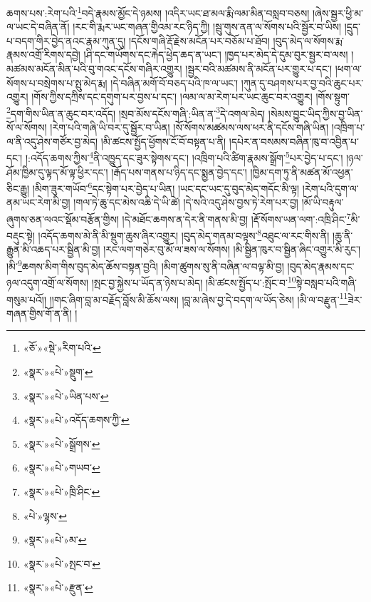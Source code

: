 ཆགས་པས་:རེག་པའི་\footnote{«ཅོ་»«སྡེ་»རིག་པའི་}བདེ་རྣམས་མྱོང་དེ་ཉམས། །འདིར་ཡང་ཐ་མལ་རྨི་ལམ་མིན་བསླབ་བཅས། །ཞེས་སྦྱར་ཕྱི་མ་ལ་ཡང་དེ་བཞིན་ནོ། །རང་གི་རྨར་ཡང་གཞན་གྱིའམ་རང་ཉིད་ཀྱི། །སྦུ་གུས་ནན་ལ་སོགས་པའི་སྦྱོར་བ་ཡིས། །དྲུད་པ་བདག་གིར་བྱེད་ནའང་རྣམ་ཀུན་དུ། །དངོས་གཞི་རྡོ་རྗེས་མངོན་པར་བཅོམ་པ་ཐོབ། །བུད་མེད་ལ་སོགས་རྨ་རྣམས་འགྲོ་རིགས་དབྱེ། །ཤི་དང་གཡོགས་དང་རྐེད་ཕྱེད་ཆད་ན་ཡང་། །ཁྱད་པར་མེད་དེ་དུམ་བུར་སྦྱར་བ་ལས། །མཚམས་མངོན་མིན་པའི་བུ་གའང་དངོས་གཞིར་འགྱུར། །སྦྱར་བའི་མཚམས་ནི་མངོན་པར་གྱུར་པ་དང་། །ཕག་ལ་སོགས་པ་བསྲེགས་པ་སྤུ་མེད་རྨ། །དེ་བཞིན་མགོ་བོ་བཅད་པའི་ཁ་ལ་ཡང་། །ཀུན་དུ་བཤགས་པར་བྱ་བའི་ཆུང་པར་འགྱུར། །གོས་ཀྱིས་དཀྲིས་དང་དགུག་པར་བྱས་པ་དང་། །ལམ་ལ་མ་རེག་པར་ཡང་ཆུང་བར་འགྱུར། །གོས་སྟུག་\footnote{«སྣར་»«པེ་»སྡུག་}དག་གིས་ཡིན་ན་ཆུང་བར་འདོད། །སྲབ་མོས་དངོས་གཞི་:ཡིན་ན་\footnote{«སྣར་»«པེ་»ཡིན་པས་}དེ་འགལ་མེད། །སེམས་བྱུང་ཡིད་ཀྱིས་བྱ་ཡིན་སོ་ལ་སོགས། །རེག་པའི་གཞི་ཡི་བར་དུ་སྦྱོར་བ་ཡིན། །སོ་སོགས་མཚམས་ལས་ཕར་ནི་དངོས་གཞི་ཡིན། །འཁྲིག་པ་ལ་ནི་འདུ་ཤེས་གཙོར་བྱ་མེད། །མི་ཚངས་སྤྱོད་ཕྱོགས་ངོ་བོ་བསྟན་པ་ནི། །དཔེར་ན་བསམས་བཞིན་ཁུ་བ་འབྱིན་པ་དང་། །:འདོད་ཆགས་ཀྱིས་\footnote{«སྣར་»«པེ་»འདོད་ཆགས་ཀྱི་}ནི་འཁྱུད་དང་ཟུར་སྟེགས་དང་། །འཁྲིག་པའི་ཚིག་རྣམས་སྒྲོག་\footnote{«སྣར་»«པེ་»སྒྲོགས་}པར་བྱེད་པ་དང་། །ཉལ་ཤོམ་ཁྱིམ་དུ་ལྟད་མོ་ལྟ་ཕྱིར་དང་། །རྒོད་པས་གནས་པ་ཉིད་དང་སྨྱན་བྱེད་དང་། །ཁྱིམ་དག་ཏུ་ནི་མཚན་མོ་འཕྱན་ཅིང་རྒྱུ། །མིག་ཟུར་གཡོབ་\footnote{«སྣར་»«པེ་»གཡབ་}དང་སྟེག་པར་བྱེད་པ་ཡིན། །ཡང་དང་ཡང་དུ་བུད་མེད་གདོང་མི་ལྟ། །རེག་པའི་དུག་ལ་ནམ་ཡང་རེག་མི་བྱ། །གལ་ཏེ་ཆུ་དང་མེས་འཆི་དེ་ཡི་ཚེ། །དེ་སའི་འདུ་ཤེས་བྱས་ཏེ་རེག་པར་བྱ། །མོ་ཡི་བརྟུལ་ཞུགས་ཅན་ལའང་སྡོམ་བརྩོན་གྱིས། །དེ་མཐོང་ཆགས་ན་དེར་ནི་གནས་མི་བྱ། །རྡོ་སོགས་ཡན་ལག་:འཁྲི་ཤིང་\footnote{«སྣར་»«པེ་»ཁྲི་ཤིང་}མི་བརྡུང་སྟེ། །འདོད་ཆགས་མེ་ནི་མི་སྡུག་ཆུས་ཞིར་འགྱུར། །བུད་མེད་གནམ་བལྟས་\footnote{«པེ་»ལྷས་}འཐུང་ལ་རང་གིས་ནི། །ཆུ་ནི་རྒྱུན་མི་འཆད་པར་སྦྱིན་མི་བྱ། །རང་ལག་གཅེར་བུ་མོ་ལ་ཟས་ལ་སོགས། །མི་སྦྱིན་ཁུར་བ་སྦྱིན་ཞིང་འགྱུར་མི་རུང་། །མི་\footnote{«སྣར་»«པེ་»མ་}ཆགས་མིག་གིས་བུད་མེད་ཆོས་བསྟན་བྱའི། །མིག་ཚུགས་སུ་ནི་བཞིན་ལ་བལྟ་མི་བྱ། །བུད་མེད་རྣམས་དང་ཉལ་འདུག་འགྲོ་ལ་སོགས། །སྤང་བྱ་སྐྱེས་པ་ཡོད་ན་ཉེས་པ་མེད། །མི་ཚངས་སྤྱོད་པ་:སྤོང་བ་\footnote{«སྣར་»«པེ་»སྤང་བ་}སྟེ་བསླབ་པའི་གཞི་གསུམ་པའོ།། །།གང་ཞིག་བླ་མ་བརྗོད་བློས་མི་ཆོས་ལས། །བླ་མ་ཞེས་བྱ་དེ་བདག་ལ་ཡོད་ཅེས། །མི་ལ་བརྫུན་\footnote{«སྣར་»«པེ་»རྫུན་}ཟེར་གཞན་གྱིས་གོ་ན་ནི། །
